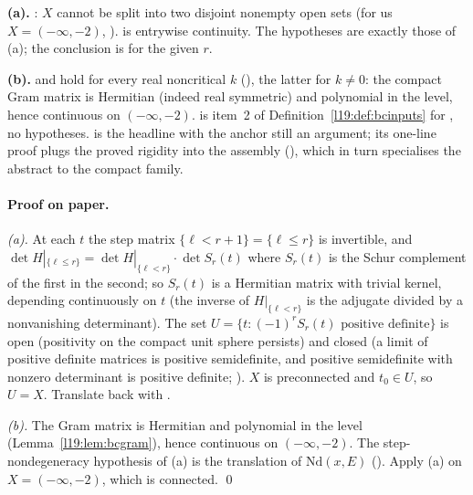 \begin{dictionary}
\textbf{(a).} : $X$ cannot be split into two disjoint nonempty open sets (for us
$X = (-\infty,-2)$, ).  is entrywise continuity. The hypotheses are exactly those
of (a); the conclusion is for the given $r$.

\textbf{(b).}  and  hold for every real noncritical $k$ (), the
latter for $k\ne0$: the compact Gram matrix is Hermitian (indeed real symmetric) and polynomial in the level, hence
continuous on $(-\infty,-2)$.  is item~2 of Definition~\ref{l19:def:bcinputs} for
, no hypotheses.  is the headline with
the anchor still an argument; its one-line proof plugs the proved rigidity into the assembly
 (), which in turn
specialises the abstract  to the compact family.
\end{dictionary}

\paragraph{Proof on paper.} \emph{(a).} At each $t$ the step matrix $\{\ell<r+1\} = \{\ell\le r\}$ is invertible, and
$\det H|_{\{\ell\le r\}} = \det H|_{\{\ell<r\}}\cdot\det S_r(t)$ where $S_r(t)$ is the Schur complement of the first in
the second; so $S_r(t)$ is a Hermitian matrix with trivial kernel, depending continuously on $t$ (the inverse of
$H|_{\{\ell<r\}}$ is the adjugate divided by a nonvanishing determinant). The set $U = \{t : (-1)^rS_r(t)\text{ positive
definite}\}$ is open (positivity on the compact unit sphere persists) and closed (a limit of positive definite matrices
is positive semidefinite, and positive semidefinite with nonzero determinant is positive definite;
). $X$ is preconnected and $t_0\in U$, so $U = X$. Translate back with
.

\emph{(b).} The Gram matrix is Hermitian and polynomial in the level (Lemma~\ref{l19:lem:bcgram}), hence
continuous on $(-\infty,-2)$. The step-nondegeneracy hypothesis of (a) is the translation of
$\mathrm{Nd}(x,E)$ (). Apply (a) on $X = (-\infty,-2)$, which is connected.
\qed

